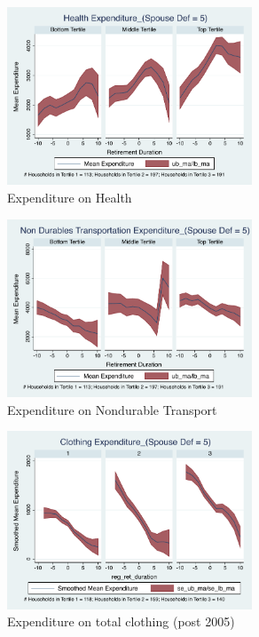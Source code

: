 \documentclass[11pt,onecolumn]{article}
\numberwithin{figure}{section}
\begin{document}
\begin{figure}[h]
	\caption{Expenditure on Health}
	\centering
	\includegraphics[width=0.65\textwidth]{../ConsumptionPostRetirement_by_SpouseDef_Cats/Smoothed/5/spouse_def_total_healthexpense_real.pdf}
\end{figure}


\begin{figure}[h]
	\caption{Expenditure on Nondurable Transport}
	\centering
	\includegraphics[width=0.65\textwidth]{../ConsumptionPostRetirement_by_SpouseDef_Cats/Smoothed/5/spouse_def_total_transport_real.pdf}
\end{figure}
\clearpage

\begin{figure}[h]
	\caption{Expenditure on total clothing (post 2005)}
	\centering
	\includegraphics[width=0.65\textwidth]{../ConsumptionPostRetirement_by_SpouseDef_Cats/Smoothed/5/spouse_def_total_clothing_2005_real.pdf}
\end{figure}
\end{document}
